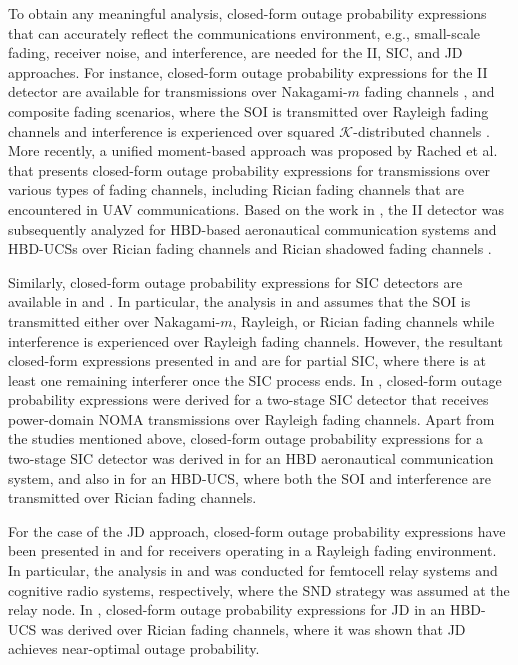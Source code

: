 To obtain any meaningful analysis, closed-form outage probability expressions that can accurately reflect the communications environment, e.g., small-scale fading, receiver noise, and interference, are needed for the II, SIC, and JD approaches. For instance, closed-form outage probability expressions for the II detector are available for transmissions over Nakagami-$m$ fading channels \cite{yao1992investigations}, and composite fading scenarios, where the SOI is transmitted over Rayleigh fading channels and interference is experienced over squared ${\mathcal{K}}$-distributed channels \cite{bithas2015mobile}. More recently, a unified moment-based approach was proposed by Rached et al. \cite{rached2017unified} that presents closed-form outage probability expressions for transmissions over various types of fading channels, including Rician fading channels that are encountered in UAV communications. Based on the work in \cite{rached2017unified}, the II detector was subsequently analyzed for HBD-based aeronautical communication systems \cite{ernest2019outage,ernest2018performance} and HBD-UCSs over Rician fading channels \cite{tan2018ricianShad, tan2018joint, ernest2018hybrid, ernest2019power, ernest2019hybrid} and Rician shadowed fading channels \cite{ernest2019noma,ernest2019power}.

Similarly, closed-form outage probability expressions for SIC detectors are available in \cite{hasna2003performance} and \cite{romero2008receive}. In particular, the analysis in \cite{hasna2003performance} and \cite{romero2008receive} assumes that the SOI is transmitted either over Nakagami-$m$, Rayleigh, or Rician fading channels while interference is experienced over Rayleigh fading channels. However, the resultant closed-form expressions presented in \cite{hasna2003performance} and \cite{romero2008receive} are for partial SIC, where there is at least one remaining interferer once the SIC process ends. In \cite{zhang2017full}, closed-form outage probability expressions were derived for a two-stage SIC detector that receives power-domain NOMA transmissions over Rayleigh fading channels. Apart from the studies mentioned above, closed-form outage probability expressions for a two-stage SIC detector was derived in \cite{ernest2019outage} for an HBD aeronautical communication system, and also in \cite{tan2018joint, ernest2018hybrid} for an HBD-UCS, where both the SOI and interference are transmitted over Rician fading channels.

For the case of the JD approach, closed-form outage probability expressions have been presented in \cite{elkourdi2011femtocell} and \cite{wui2016outage} for receivers operating in a Rayleigh fading environment. In particular, the analysis in \cite{elkourdi2011femtocell} and \cite{wui2016outage} was conducted for femtocell relay systems and cognitive radio systems, respectively, where the SND strategy was assumed at the relay node. In \cite{tan2018joint}, closed-form outage probability expressions for JD in an HBD-UCS was derived over Rician fading channels, where it was shown that JD achieves near-optimal outage probability.

